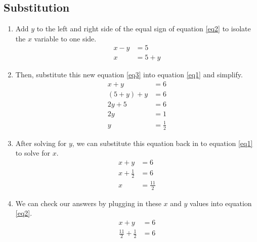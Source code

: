 \documentclass{article}
\begin{document}
    \subsection*{Substitution}
    \begin{enumerate}
    \item Add $y$ to the left and right side of the equal sign of equation \eqref{eq2} to isolate the $x$ variable to one side.
    \begin{align}
        x - y &= 5 \nonumber \\
        x &= 5 + y \label{eq3}
    \end{align} 
    \item Then, substitute this new equation \eqref{eq3} into equation \eqref{eq1} and simplify.
    \begin{align*}
        x + y &= 6 \\
        (5 + y) + y &= 6 \\
        2y + 5 &= 6 \\
        2y &= 1 \\
        y &= \frac{1}{2}
    \end{align*}
    \item After solving for $y$, we can substitute this equation back in to equation \eqref{eq1} to solve for $x$.
    \begin{align*}
        x + y &= 6 \\
        x + \frac{1}{2} &= 6 \\
        x &= \frac{11}{2}
    \end{align*} 
    \item We can check our answers by plugging in these $x$ and $y$ values into equation \eqref{eq2}.
    \begin{align*}
        x + y &= 6 \\
        \frac{11}{2} + \frac{1}{2} &= 6
    \end{align*}
    \end{enumerate}
\end{document}

